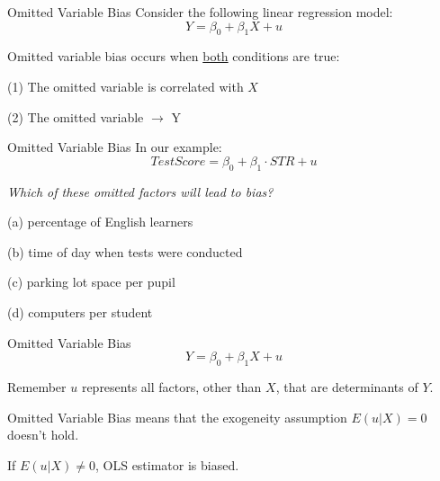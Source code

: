 \documentclass{./../div_teaching_slides}
\begin{document}
\begin{frame}{Omitted Variable Bias}
Consider the following linear regression model:
$$ Y = \beta_0 + \beta_1 X + u  $$
\vspace{0.25em}

Omitted variable bias occurs when \underline{both} conditions are true: \\  \vspace{0.25em}
\begin{witemize}
  \item[(1)] The omitted variable is correlated with $X$
  \item[(2)] The omitted variable $\rightarrow$ Y
\end{witemize}
\end{frame}


\begin{frame}{Omitted Variable Bias}
In our example:
$$ Test Score = \beta_0 + \beta_1 \cdot STR + u $$

\textit{Which of these omitted factors will lead to bias?}  \\ \vspace{0.25em}
\begin{witemize}
  \item[(a)] percentage of English learners
  \item[(b)] time of day when tests were conducted
  \item[(c)] parking lot space per pupil
  \item[(d)] computers per student
\end{witemize}

\end{frame}

\begin{frame}{Omitted Variable Bias}
$$ Y = \beta_0 + \beta_1 X + u  $$
\begin{witemize}
  \item Remember $u$ represents all factors, other than $X$, that are determinants of $Y$.
  \item Omitted Variable Bias means that the exogeneity assumption $E(u|X)=0$ doesn't hold.
  \item If $E(u|X)\neq 0$, OLS estimator is biased.
\end{witemize}
\end{frame}
\end{document}
